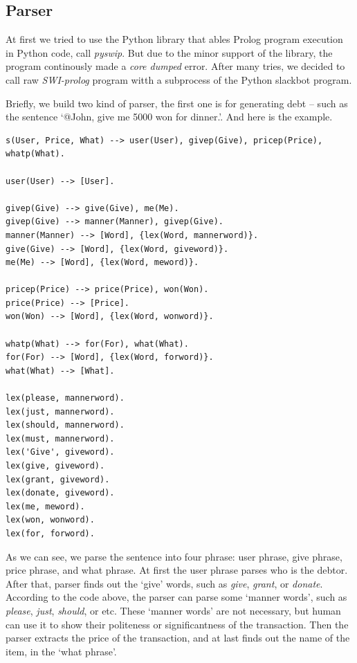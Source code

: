 \documentclass[11pt]{article}
\begin{document}
\subsection{Parser}

At first we tried to use the Python library that ables Prolog program execution
in Python code, call \textit{pyswip}. But due to the minor support of the library,
the program continously made a \textit{core dumped} error.
After many tries, we decided to call raw \textit{SWI-prolog} program
witth a subprocess of the Python slackbot program.

Briefly, we build two kind of parser, the first one is for generating debt --
such as the sentence `@John, give me 5000 won for dinner.'. And here is the example.

\begin{verbatim}
s(User, Price, What) --> user(User), givep(Give), pricep(Price), whatp(What).

user(User) --> [User].

givep(Give) --> give(Give), me(Me).
givep(Give) --> manner(Manner), givep(Give).
manner(Manner) --> [Word], {lex(Word, mannerword)}.
give(Give) --> [Word], {lex(Word, giveword)}.
me(Me) --> [Word], {lex(Word, meword)}.

pricep(Price) --> price(Price), won(Won).
price(Price) --> [Price].
won(Won) --> [Word], {lex(Word, wonword)}.

whatp(What) --> for(For), what(What).
for(For) --> [Word], {lex(Word, forword)}.
what(What) --> [What].

lex(please, mannerword).
lex(just, mannerword).
lex(should, mannerword).
lex(must, mannerword).
lex('Give', giveword).
lex(give, giveword).
lex(grant, giveword).
lex(donate, giveword).
lex(me, meword).
lex(won, wonword).
lex(for, forword).
\end{verbatim}

As we can see, we parse the sentence into four phrase:
user phrase, give phrase, price phrase, and what phrase.
At first the user phrase parses who is the debtor.
After that, parser finds out the `give' words, such as \textit{give},
\textit{grant}, or \textit{donate}.
According to the code above, the parser can parse some `manner words',
such as \textit{please}, \textit{just}, \textit{should}, or etc.
These `manner words' are not necessary, but human can use it to show
their politeness or significantness of the transaction.
Then the parser extracts the price of the transaction, and at last
finds out the name of the item, in the `what phrase'.
\end{document}
